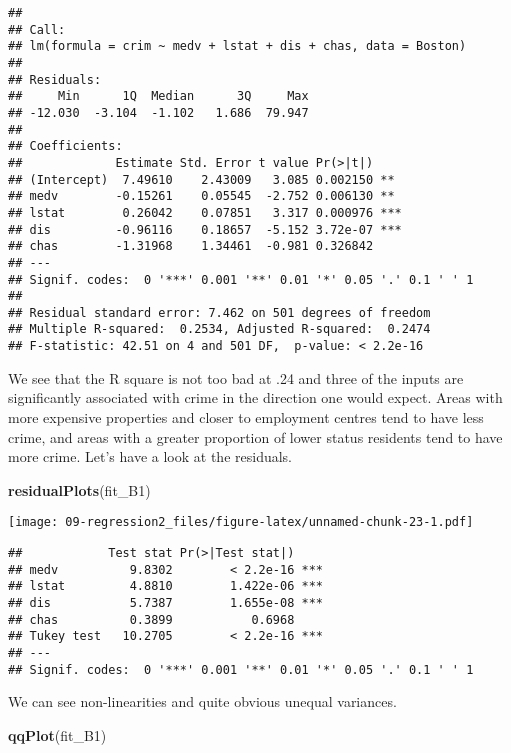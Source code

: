 \documentclass[
]{book}
\newenvironment{Shaded}{\begin{snugshade}}{\end{snugshade}}
\newcommand{\FunctionTok}[1]{\textcolor[rgb]{0.13,0.29,0.53}{\textbf{#1}}}
\newcommand{\NormalTok}[1]{#1}
\begin{document}
\begin{verbatim}
## 
## Call:
## lm(formula = crim ~ medv + lstat + dis + chas, data = Boston)
## 
## Residuals:
##     Min      1Q  Median      3Q     Max 
## -12.030  -3.104  -1.102   1.686  79.947 
## 
## Coefficients:
##             Estimate Std. Error t value Pr(>|t|)    
## (Intercept)  7.49610    2.43009   3.085 0.002150 ** 
## medv        -0.15261    0.05545  -2.752 0.006130 ** 
## lstat        0.26042    0.07851   3.317 0.000976 ***
## dis         -0.96116    0.18657  -5.152 3.72e-07 ***
## chas        -1.31968    1.34461  -0.981 0.326842    
## ---
## Signif. codes:  0 '***' 0.001 '**' 0.01 '*' 0.05 '.' 0.1 ' ' 1
## 
## Residual standard error: 7.462 on 501 degrees of freedom
## Multiple R-squared:  0.2534, Adjusted R-squared:  0.2474 
## F-statistic: 42.51 on 4 and 501 DF,  p-value: < 2.2e-16
\end{verbatim}

We see that the R square is not too bad at .24 and three of the inputs are significantly associated with crime in the direction one would expect. Areas with more expensive properties and closer to employment centres tend to have less crime, and areas with a greater proportion of lower status residents tend to have more crime. Let's have a look at the residuals.

\begin{Shaded}
\begin{Highlighting}[]
\FunctionTok{residualPlots}\NormalTok{(fit\_B1)}
\end{Highlighting}
\end{Shaded}

\texttt{[image: 09-regression2\_files/figure-latex/unnamed-chunk-23-1.pdf]}

\begin{verbatim}
##            Test stat Pr(>|Test stat|)    
## medv          9.8302        < 2.2e-16 ***
## lstat         4.8810        1.422e-06 ***
## dis           5.7387        1.655e-08 ***
## chas          0.3899           0.6968    
## Tukey test   10.2705        < 2.2e-16 ***
## ---
## Signif. codes:  0 '***' 0.001 '**' 0.01 '*' 0.05 '.' 0.1 ' ' 1
\end{verbatim}

We can see non-linearities and quite obvious unequal variances.

\begin{Shaded}
\begin{Highlighting}[]
\FunctionTok{qqPlot}\NormalTok{(fit\_B1)}
\end{Highlighting}
\end{Shaded}
\end{document}
